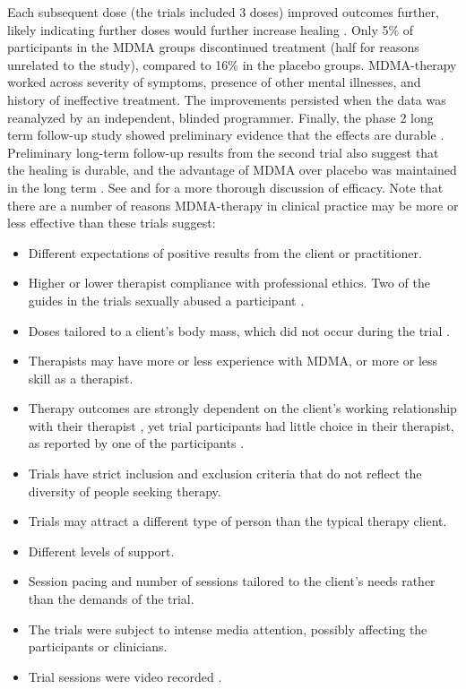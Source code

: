 \documentclass[12pt,letterpaper]{book}
\begin{document}
Each subsequent dose (the trials included 3 doses) improved outcomes further, likely indicating further doses would further increase healing \cite{mitchellMDMAClinicalTrial,mitchellMDMAClinicalTrial2}. Only 5\% of participants in the MDMA groups discontinued treatment (half for reasons unrelated to the study), compared to 16\% in the placebo groups. MDMA-therapy worked across severity of symptoms, presence of other mental illnesses, and history of ineffective treatment. The improvements persisted when the data was reanalyzed by an independent, blinded programmer. Finally, the phase 2 long term follow-up study showed preliminary evidence that the effects are durable \cite{jeromeMDMALongTerm}. Preliminary long-term follow-up results from the second trial also suggest that the healing is durable, and the advantage of MDMA over placebo was maintained in the long term \cite{mplongPreliminary}. See \textcite{wolfgang2025} and \textcite{icerReport} for a more thorough discussion of efficacy. Note that there are a number of reasons MDMA-therapy in clinical practice may be more or less effective than these trials suggest:
\begin{itemize}
    \item Different expectations of positive results from the client or practitioner.
    \item Higher or lower therapist compliance with professional ethics. Two of the guides in the trials sexually abused a participant \cite{powerTrip}.
    \item Doses tailored to a client's body mass, which did not occur during the trial \cite{mitchellMDMAClinicalTrial}.
    \item Therapists may have more or less experience with MDMA, or more or less skill as a therapist.
    \item Therapy outcomes are strongly dependent on the client's working relationship with their therapist \cite{BRWAIdownload}, yet trial participants had little choice in their therapist, as reported by one of the participants \cite{kacandaNoChoice}.
    \item Trials have strict inclusion and exclusion criteria that do not reflect the diversity of people seeking therapy.
    \item Trials may attract a different type of person than the typical therapy client.
    \item Different levels of support.
    \item Session pacing and number of sessions tailored to the client's needs rather than the demands of the trial.
    \item The trials were subject to intense media attention, possibly affecting the participants or clinicians.
    \item Trial sessions were video recorded \cite{mitchellMDMAClinicalTrial}.
\end{itemize}
\end{document}
